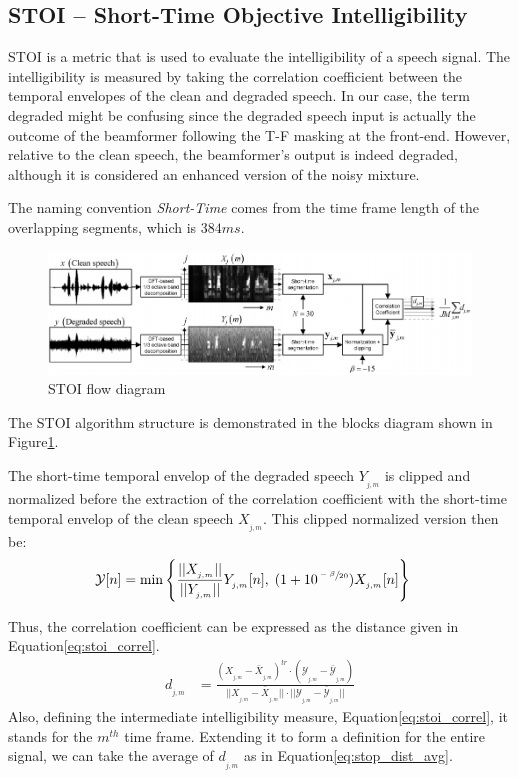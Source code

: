 \subsection{STOI -- Short-Time Objective Intelligibility}
STOI\cite{5495701} is a metric that is used to evaluate 
the intelligibility of a speech signal.
The intelligibility is measured by taking the correlation
coefficient between the temporal envelopes of the clean
and degraded speech. In our case, the term degraded might
be confusing since the degraded speech input
is actually the outcome of the beamformer
following the T-F masking at the front-end.
However, relative to the clean speech, 
the beamformer's output is indeed degraded, although
it is considered an enhanced version of the noisy mixture.

The naming convention \emph{Short-Time} comes from the time frame length
of the overlapping segments, which is \(384 ms\).  
\begin{figure}[H]
    \centering
    \includegraphics[width=\linewidth]{Features/images/stoi_blocks_diagram}
    \caption{STOI flow diagram}\label{fig:stoi_blocks_diagram}
\end{figure}

The STOI algorithm structure is demonstrated in 
the blocks diagram shown in Figure\;\ref{fig:stoi_blocks_diagram}. 

The short-time temporal envelop of the degraded
speech \(Y_{_{j,m}}\) is clipped and normalized
before the extraction of the correlation coefficient
with the short-time temporal envelop of the
clean speech \(X_{_{j,m}}\).
This clipped normalized version then be:
\begin{align}
    \mathcal{Y}[n] & = \min\Bigg\{ 
            \frac{||X_{_{j,m}}||}{||Y_{_{j,m}}||} Y_{_{j,m}}[n]
            ,\; (1+10^{\sfrac{-\beta}{20}})X_{_{j,m}}[n]
        \Bigg\}
\end{align}

Thus, the correlation coefficient can be expressed as the
distance given in Equation\;\ref{eq:stoi_correl}.
\begin{align}\label{eq:stoi_correl}
    d_{_{j,m}} & = \frac{
            (X_{_{j,m}}-\bar{X}_{_{j,m}})^{tr} 
            \cdot (\mathcal{Y}_{_{j,m}}-\bar{\mathcal{Y}}_{_{j,m}})
        }
        {
            ||X_{_{j,m}}-\bar{X}_{_{j,m}}||
            \cdot ||\mathcal{Y}_{_{j,m}}-\bar{\mathcal{Y}}_{_{j,m}}|| 
        }
\end{align}
Also, defining the intermediate intelligibility measure, 
Equation\;\ref{eq:stoi_correl}, it stands for the
\(m^{th}\) time frame. Extending it to form
a definition for the entire signal,
we can take the average of \(d_{_{j,m}}\)
as in Equation\;\ref{eq:stop_dist_avg}.

